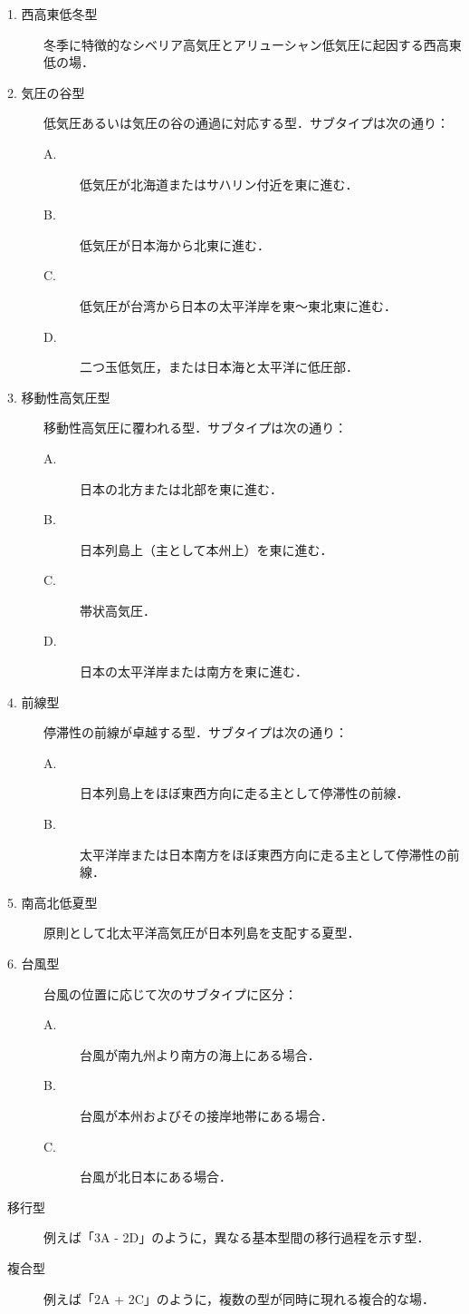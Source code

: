 \documentclass{jarticle}
\theoremstyle{definition}
\begin{document}
\begin{description}
\item[1. 西高東低冬型] 冬季に特徴的なシベリア高気圧とアリューシャン低気圧に起因する西高東低の場．
\item[2. 気圧の谷型] 低気圧あるいは気圧の谷の通過に対応する型．サブタイプは次の通り：
  \begin{description}
    \item[A.] 低気圧が北海道またはサハリン付近を東に進む．
    \item[B.] 低気圧が日本海から北東に進む．
    \item[C.] 低気圧が台湾から日本の太平洋岸を東〜東北東に進む．
    \item[D.] 二つ玉低気圧，または日本海と太平洋に低圧部．
  \end{description}
\item[3. 移動性高気圧型] 移動性高気圧に覆われる型．サブタイプは次の通り：
  \begin{description}
    \item[A.] 日本の北方または北部を東に進む．
    \item[B.] 日本列島上（主として本州上）を東に進む．
    \item[C.] 帯状高気圧．
    \item[D.] 日本の太平洋岸または南方を東に進む．
  \end{description}
\item[4. 前線型] 停滞性の前線が卓越する型．サブタイプは次の通り：
  \begin{description}
    \item[A.] 日本列島上をほぼ東西方向に走る主として停滞性の前線．
    \item[B.] 太平洋岸または日本南方をほぼ東西方向に走る主として停滞性の前線．
  \end{description}
\item[5. 南高北低夏型] 原則として北太平洋高気圧が日本列島を支配する夏型．
\item[6. 台風型] 台風の位置に応じて次のサブタイプに区分：
  \begin{description}
    \item[A.] 台風が南九州より南方の海上にある場合．
    \item[B.] 台風が本州およびその接岸地帯にある場合．
    \item[C.] 台風が北日本にある場合．
  \end{description}
\item[移行型] 例えば「3A - 2D」のように，異なる基本型間の移行過程を示す型．
\item[複合型] 例えば「2A + 2C」のように，複数の型が同時に現れる複合的な場．
\end{description}
\end{document}
